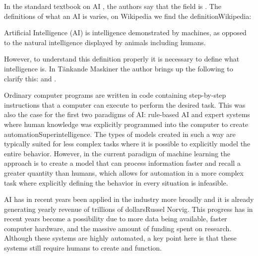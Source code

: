 \documentclass[12pt,A4]{report}
\newcommand{\autobaj}{}
\theoremstyle{definition}
\begin{document}
In the standard textbook on AI \autocite{RusselNorvig}, the authors say that the field is . The definitions of what an AI is varies, on Wikipedia we find the definition\autobaj{Wikipedia}:
\begin{displayquote}
Artificial Intelligence (AI) is intelligence demonstrated by machines, as opposed to the natural intelligence displayed by animals including humans.
\end{displayquote}
However, to understand this definition properly it is necessary to define what intelligence is. In \autobaj{Tänkande Maskiner} the author brings up the following to clarify this:  and . 


Ordinary computer programs are written in code containing step-by-step instructions that a computer can execute to perform the desired task. This was also the case for the first two paradigms of AI: rule-based AI and expert systems where human knowledge was explicitly programmed into the computer to create automation\autobaj{Superintelligence}. The types of models created in such a way are typically suited for less complex tasks where it is possible to explicitly model the entire behavior. However, in the current paradigm of machine learning the approach is to create a model that can process information faster and recall a greater quantity than humans, which allows for automation in a more complex task where explicitly defining the behavior in every situation is infeasible. 

AI has in recent years been applied in the industry more broadly and it is already generating yearly revenue of trillions of dollars\autobaj{Russel Norvig}. This progress has in recent years become a possibility due to more data being available, faster computer hardware, and the massive amount of funding spent on research. Although these systems are highly automated, a key point here is that these systems still require humans to create and function.
\end{document}
